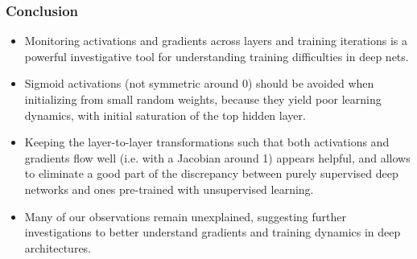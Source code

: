 \begin{frame}
  \frametitle{Conclusion}

  \begin{itemize}
    \item Monitoring activations and gradients across layers and
    training iterations is a powerful investigative tool for understanding training difficulties in deep nets.

    \item Sigmoid activations (not symmetric around 0) should be avoided when initializing from small random weights, because they yield poor learning dynamics, with initial saturation of the top hidden layer.
    \item Keeping the layer-to-layer transformations such that both activations and gradients flow well (i.e. with a Jacobian around 1) appears helpful, and allows to eliminate a good part of the discrepancy between purely supervised deep networks and ones pre-trained with unsupervised learning.
    \item Many of our observations remain unexplained, suggesting further investigations to better understand gradients and training dynamics in deep architectures.

  \end{itemize}

\end{frame}


    
